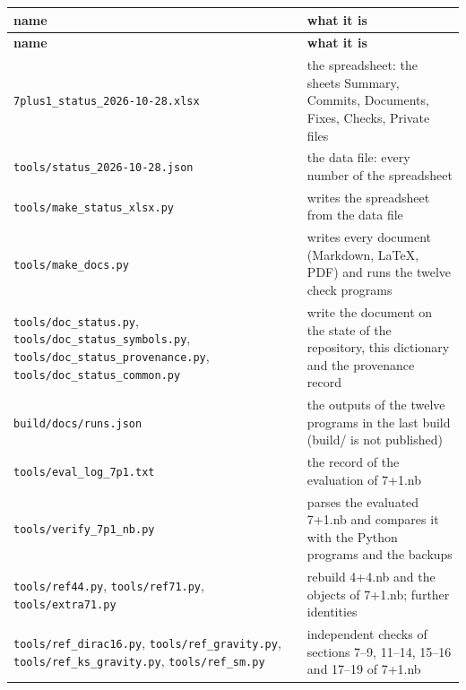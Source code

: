 \documentclass[10pt,a4paper]{article}
\begin{document}
{\footnotesize
\begin{longtable}{>{\raggedright\arraybackslash}p{}>{\raggedright\arraybackslash}p{}}
\toprule
\textbf{name} & \textbf{what it is} \\
\midrule\endfirsthead
\toprule
\textbf{name} & \textbf{what it is} \\
\midrule\endhead
\endfoot
\bottomrule\endlastfoot
\texttt{7plus1\_\allowbreak{}status\_\allowbreak{}2026-10-28.xlsx} & the spreadsheet: the sheets Summary, Commits, Documents, Fixes, Checks, Private files \\
\texttt{tools/\allowbreak{}status\_\allowbreak{}2026-10-28.json} & the data file: every number of the spreadsheet \\
\texttt{tools/\allowbreak{}make\_\allowbreak{}status\_\allowbreak{}xlsx.py} & writes the spreadsheet from the data file \\
\texttt{tools/\allowbreak{}make\_\allowbreak{}docs.py} & writes every document (Markdown, LaTeX, PDF) and runs the twelve check programs \\
\texttt{tools/\allowbreak{}doc\_\allowbreak{}status.py}, \texttt{tools/\allowbreak{}doc\_\allowbreak{}status\_\allowbreak{}symbols.py}, \texttt{tools/\allowbreak{}doc\_\allowbreak{}status\_\allowbreak{}provenance.py}, \texttt{tools/\allowbreak{}doc\_\allowbreak{}status\_\allowbreak{}common.py} & write the document on the state of the repository, this dictionary and the provenance record \\
\texttt{build/\allowbreak{}docs/\allowbreak{}runs.json} & the outputs of the twelve programs in the last build (build/ is not published) \\
\texttt{tools/\allowbreak{}eval\_\allowbreak{}log\_\allowbreak{}7p1.txt} & the record of the evaluation of 7+1.nb \\
\texttt{tools/\allowbreak{}verify\_\allowbreak{}7p1\_\allowbreak{}nb.py} & parses the evaluated 7+1.nb and compares it with the Python programs and the backups \\
\texttt{tools/\allowbreak{}ref44.py}, \texttt{tools/\allowbreak{}ref71.py}, \texttt{tools/\allowbreak{}extra71.py} & rebuild 4+4.nb and the objects of 7+1.nb; further identities \\
\texttt{tools/\allowbreak{}ref\_\allowbreak{}dirac16.py}, \texttt{tools/\allowbreak{}ref\_\allowbreak{}gravity.py}, \texttt{tools/\allowbreak{}ref\_\allowbreak{}ks\_\allowbreak{}gravity.py}, \texttt{tools/\allowbreak{}ref\_\allowbreak{}sm.py} & independent checks of sections 7–9, 11–14, 15–16 and 17–19 of 7+1.nb \\

\end{longtable}}
\end{document}
